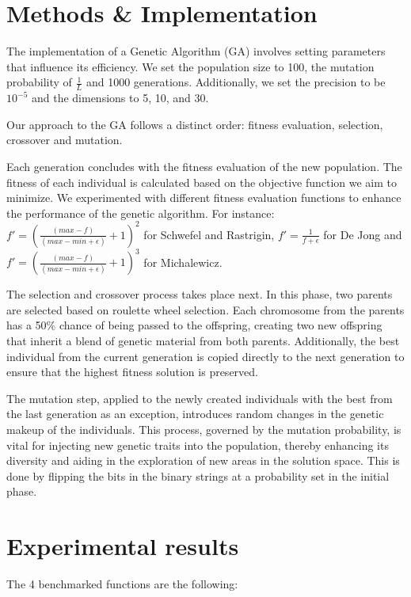 \documentclass{article}
\begin{document}
\section{Methods \& Implementation}
The implementation of a Genetic Algorithm (GA) involves setting parameters that influence its efficiency. We set the population size to 100, the mutation probability of $\frac{1}{L}$ and 1000 generations. Additionally, we set the precision to be $10^{-5}$ and the dimensions to 5, 10, and 30.

Our approach to the GA follows a distinct order: fitness evaluation, selection, crossover and mutation.

Each generation concludes with the fitness evaluation of the new population. The fitness of each individual is calculated based on the objective function we aim to minimize. We experimented with different fitness evaluation functions to enhance the performance of the genetic algorithm. For instance: \\
$f' = \left(\frac{(max - f)}{(max - min + \epsilon)} + 1\right)^2$ for Schwefel and Rastrigin, $f'=\frac{1}{f+\epsilon}$ for De Jong and $f' = \left(\frac{(max - f)}{(max - min + \epsilon)} + 1\right)^3$ for Michalewicz.

The selection and crossover process takes place next. In this phase, two parents are selected based on roulette wheel selection. Each chromosome from the parents has a 50\% chance of being passed to the offspring, creating two new offspring that inherit a blend of genetic material from both parents. Additionally, the best individual from the current generation is copied directly to the next generation to ensure that the highest fitness solution is preserved.

The mutation step, applied to the newly created individuals with the best from the last generation as an exception, introduces random changes in the genetic makeup of the individuals. This process, governed by the mutation probability, is vital for injecting new genetic traits into the population, thereby enhancing its diversity and aiding in the exploration of new areas in the solution space. This is done by flipping the bits in the binary strings at a probability set in the initial phase.



\section{Experimental results}
The 4 benchmarked functions are the following:
\newpage
\end{document}
